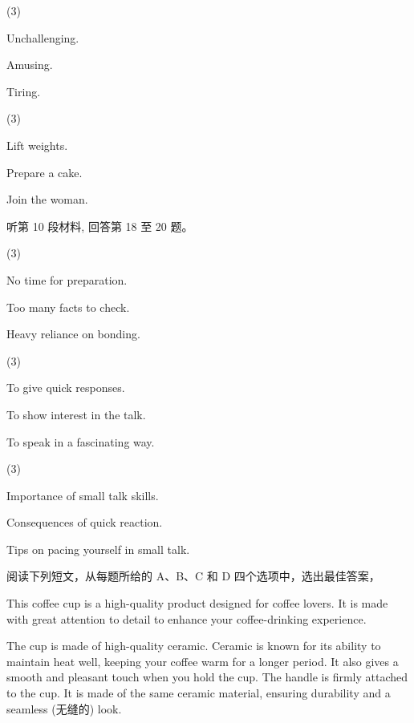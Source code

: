 \documentclass{英语试卷}
\begin{document}
\begin{choices}(3)
  \item Unchallenging.
  \item Amusing.
  \item Tiring.
\end{choices}
\begin{choices}(3)
  \item Lift weights.
  \item Prepare a cake.
  \item Join the woman.
\end{choices}
\par 听第 10 段材料, 回答第 18 至 20 题。\par
{}
\begin{choices}(3)
  \item No time for preparation.
  \item Too many facts to check.
  \item Heavy reliance on bonding.
\end{choices}
\begin{choices}(3)
  \item To give quick responses.
  \item To show interest in the talk.
  \item To speak in a fascinating way.
\end{choices}
\begin{choices}(3)
  \item Importance of small talk skills.
  \item Consequences of quick reaction.
  \item Tips on pacing yourself in small talk.
\end{choices}
\par 阅读下列短文，从每题所给的 A、B、C 和 D 四个选项中，选出最佳答案，\par
{}
\par This coffee cup is a high-quality product designed for coffee lovers. It is made with great attention to detail to enhance your coffee-drinking experience.\par
\par The cup is made of high-quality ceramic. Ceramic is known for its ability to maintain heat well, keeping your coffee warm for a longer period. It also gives a smooth and pleasant touch when you hold the cup. The handle is firmly attached to the cup. It is made of the same ceramic material, ensuring durability and a seamless (无缝的) look.\par
\end{document}
